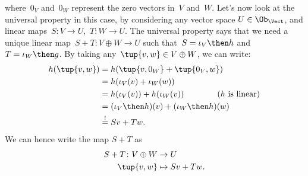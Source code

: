{\begin{example}
\begin{equation*}
  \end{equation*}
  where~$0_V$ and~$0_W$ represent the zero vectors in~$V$ and~$W$. Let's now look at the universal property in this case, by considering any vector space $U\in \Ob_\Vect$, and linear maps~$S\colon V\to U$,~$T\colon W\to U$. The universal property says that we need a unique linear map~$S+T\colon V\oplus W \to U$ such that~$S=\iota_V\then h$ and~$T=\iota_W\then g$. By taking any~$\tup{v,w}\in V\oplus W$, we can write:
  \begin{equation*}
    \begin{aligned}
      h(\tup{v,w})&=h(\tup{v,0_W}+\tup{0_V,w})\\
      &=h(\iota_V(v)+\iota_W(w)) \\
      &=h(\iota_V(v))+h(\iota_W(v)) \qquad \qquad (h \text{ is linear})\\
      &=(\iota_V\then h)(v)+(\iota_W\then h)(w)\\
      &\overset{!}{=}Sv+Tw.
    \end{aligned}
  \end{equation*}
  We can hence write the map $S+T$ as
  \begin{equation*}
    \begin{aligned}
      S+T\colon V\oplus W&\to U\\
      \tup{v,w}&\mapsto Sv+Tw.
    \end{aligned}
  \end{equation*}
\end{example}
 }
